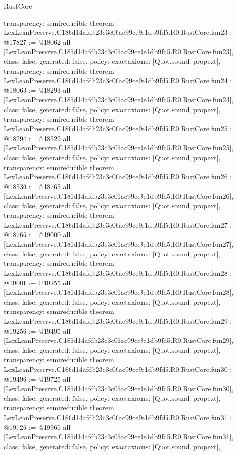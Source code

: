 \begin{lexlean}{RustCore}
\begin{coremodule}
{  transparency: semireducible
}
theorem LexLeanPreserve.C186d14afdb23c3c06ac99ce9e1db9fd5.R0.RustCore.fun23 : @17827 := @18062 {
  all: [LexLeanPreserve.C186d14afdb23c3c06ac99ce9e1db9fd5.R0.RustCore.fun23],
  class: false,
  generated: false,
  policy: exact{axioms: [Quot.sound, propext]},
  transparency: semireducible
}
theorem LexLeanPreserve.C186d14afdb23c3c06ac99ce9e1db9fd5.R0.RustCore.fun24 : @18063 := @18293 {
  all: [LexLeanPreserve.C186d14afdb23c3c06ac99ce9e1db9fd5.R0.RustCore.fun24],
  class: false,
  generated: false,
  policy: exact{axioms: [Quot.sound, propext]},
  transparency: semireducible
}
theorem LexLeanPreserve.C186d14afdb23c3c06ac99ce9e1db9fd5.R0.RustCore.fun25 : @18294 := @18529 {
  all: [LexLeanPreserve.C186d14afdb23c3c06ac99ce9e1db9fd5.R0.RustCore.fun25],
  class: false,
  generated: false,
  policy: exact{axioms: [Quot.sound, propext]},
  transparency: semireducible
}
theorem LexLeanPreserve.C186d14afdb23c3c06ac99ce9e1db9fd5.R0.RustCore.fun26 : @18530 := @18765 {
  all: [LexLeanPreserve.C186d14afdb23c3c06ac99ce9e1db9fd5.R0.RustCore.fun26],
  class: false,
  generated: false,
  policy: exact{axioms: [Quot.sound, propext]},
  transparency: semireducible
}
theorem LexLeanPreserve.C186d14afdb23c3c06ac99ce9e1db9fd5.R0.RustCore.fun27 : @18766 := @19000 {
  all: [LexLeanPreserve.C186d14afdb23c3c06ac99ce9e1db9fd5.R0.RustCore.fun27],
  class: false,
  generated: false,
  policy: exact{axioms: [Quot.sound, propext]},
  transparency: semireducible
}
theorem LexLeanPreserve.C186d14afdb23c3c06ac99ce9e1db9fd5.R0.RustCore.fun28 : @19001 := @19255 {
  all: [LexLeanPreserve.C186d14afdb23c3c06ac99ce9e1db9fd5.R0.RustCore.fun28],
  class: false,
  generated: false,
  policy: exact{axioms: [Quot.sound, propext]},
  transparency: semireducible
}
theorem LexLeanPreserve.C186d14afdb23c3c06ac99ce9e1db9fd5.R0.RustCore.fun29 : @19256 := @19495 {
  all: [LexLeanPreserve.C186d14afdb23c3c06ac99ce9e1db9fd5.R0.RustCore.fun29],
  class: false,
  generated: false,
  policy: exact{axioms: [Quot.sound, propext]},
  transparency: semireducible
}
theorem LexLeanPreserve.C186d14afdb23c3c06ac99ce9e1db9fd5.R0.RustCore.fun30 : @19496 := @19725 {
  all: [LexLeanPreserve.C186d14afdb23c3c06ac99ce9e1db9fd5.R0.RustCore.fun30],
  class: false,
  generated: false,
  policy: exact{axioms: [Quot.sound, propext]},
  transparency: semireducible
}
theorem LexLeanPreserve.C186d14afdb23c3c06ac99ce9e1db9fd5.R0.RustCore.fun31 : @19726 := @19965 {
  all: [LexLeanPreserve.C186d14afdb23c3c06ac99ce9e1db9fd5.R0.RustCore.fun31],
  class: false,
  generated: false,
  policy: exact{axioms: [Quot.sound, propext]},
}
\end{coremodule}
\end{lexlean}
